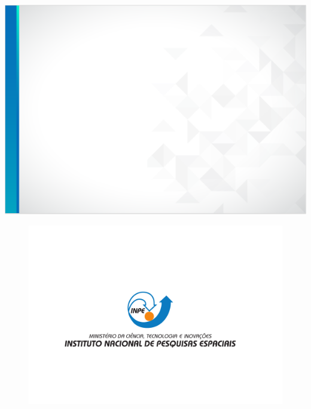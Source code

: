 \documentclass[10pt,aspectratio=169]{beamer}
\begin{document}
\usebackgroundtemplate%
{%
	\includegraphics[width=\paperwidth,height=\paperheight]{fundo_slide_inpe_sem_logo.png}%
}

\begingroup
{}
{\nologo
\begin{frame}
	\begin{figure}[H]
    	\vspace{-4em}
		\centering
        	\hspace*{1.5em}\includegraphics[width=1.\textwidth]{DesinacaoNominativaCentralizada2020.pdf}
	\end{figure}
\end{frame}
}
\endgroup
\end{document}

